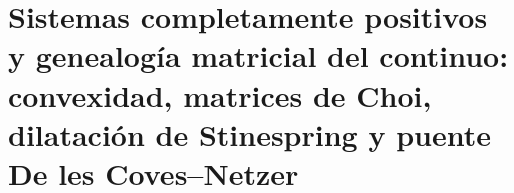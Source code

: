 





\chapter{Sistemas completamente positivos y genealogía matricial del continuo: convexidad, matrices de Choi, dilatación de Stinespring y puente De les Coves–Netzer}
\label{chap:sucesor-102-26}
\label{chap:83-22}
\def\HMTGMCOperatorialAPP{1}
\def\HMTGMCDoubleProjection{1}
\def\HMTGMCContinuumMPS{1}
\def\HMTGMCOperatorialTower{1}

\let\HMTGMCOperatorialAPP\undefined
\let\HMTGMCDoubleProjection\undefined
\let\HMTGMCContinuumMPS\undefined
\let\HMTGMCOperatorialTower\undefined

